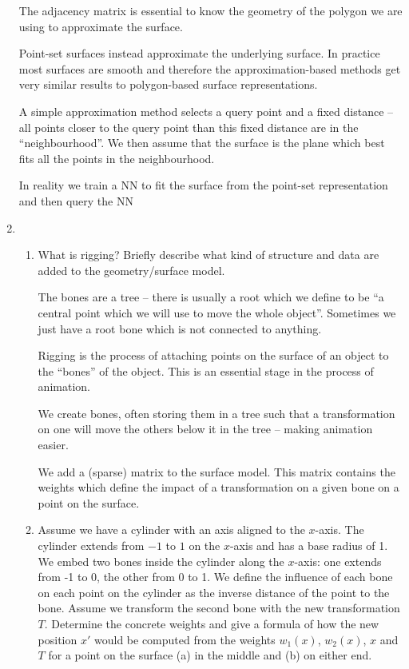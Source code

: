 \documentclass[10pt,\jkfside,a4paper]{article}
\begin{document}
\begin{enumerate}
The adjacency matrix is essential to know the geometry of the polygon we are
using to  approximate the surface.

Point-set surfaces instead approximate the underlying surface. In
practice most surfaces are smooth and therefore the approximation-based
methods get very similar results to polygon-based surface representations.

A simple approximation method selects a query point and a fixed distance --
all points closer to the query point than this fixed distance are in the
``neighbourhood''. We then assume that the surface is the plane which best
fits all the points in the neighbourhood.

{\color{blue} In reality we train a NN to fit the surface from the point-set
representation and then query the NN}

\setcounter{enumi}{13}

\item

\begin{enumerate}

\item What is rigging? Briefly describe what kind of structure and data are
added to the geometry/surface model.

{\color{blue} The bones are a tree -- there is usually a root which we
define to be ``a central point which we will use to move the whole object''.
 Sometimes we just have a root bone which is not connected to anything.}

Rigging is the process of attaching points on the surface of an object to the
``bones'' of the object. This is an essential stage in the process of
animation.

We create bones, often storing them in a tree such that a transformation on
one will move the others below it in the tree -- making animation easier.

We add a (sparse) matrix to the surface model. This matrix
contains the weights which define the impact of a transformation on a
given bone on a point on the surface.

\item Assume we have a cylinder with an axis aligned to the $x$-axis. The
cylinder extends from $-1$ to $1$ on the $x$-axis and has a base radius of 1.
We embed two bones inside the cylinder along the $x$-axis: one extends from
-1 to 0, the other from 0 to 1. We define the influence of each bone on each
point on the cylinder as the inverse distance of the point to the bone.
Assume we transform the second bone with the new transformation $T$.
Determine the concrete weights and give a formula of how the new position
$x'$ would be computed from the weights $w_1(x)$, $w_2(x)$, $x$ and $T$ for
a point on the surface (a) in the middle and (b) on either end.


\end{enumerate}
\end{enumerate}
\end{document}
